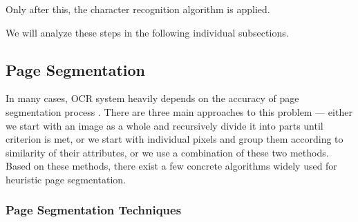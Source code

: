 Only after this, the character recognition algorithm is applied.

We will analyze these steps in the following individual subsections.

\subsection{Page Segmentation}

In many cases, OCR system heavily depends on the accuracy of page segmentation process \citep{pageSegmentation}. There are three main approaches \citep{segmentationBenchmark} to this problem --- either we start with an image as a whole and recursively divide it into parts until criterion is met, or we start with individual pixels and group them according to similarity of their attributes, or we use a combination of these two methods. Based on these methods, there exist a few concrete algorithms widely used for heuristic page segmentation.

\subsubsection{Page Segmentation Techniques}


\clearpage


